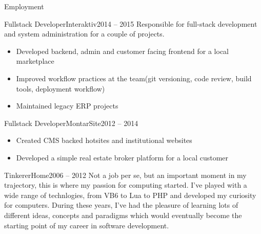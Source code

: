 \documentclass[]{Arroyo}
\begin{document}
\begin{cvsection}{Employment}
		\begin{cvsubsection}{Fullstack Developer}{Interaktiv}{2014 -- 2015}		
            Responsible for full-stack development and system administration for a couple of projects.
			\begin{itemize}
                \item Developed backend, admin and customer facing frontend for a local marketplace
                \item Improved workflow practices at the team(git versioning, code review, build tools, deployment workflow)
                \item Maintained legacy ERP projects
			\end{itemize}
		\end{cvsubsection}
		
		\begin{cvsubsection}{Fullstack Developer}{MontarSite}{2012 -- 2014}
			\begin{itemize}
                \item Created CMS backed hotsites and institutional websites
                \item Developed a simple real estate broker platform for a local customer
			\end{itemize} \end{cvsubsection}

		\begin{cvsubsection}{Tinkerer}{Home}{2006 -- 2012}
            Not a job per se, but an important moment in my trajectory, this is where my passion for computing started. I've played with a wide range of technlogies, from VB6 to Lua to PHP and developed my curiosity for computers.
            During these years, I’ve had the pleasure of learning lots of different ideas, concepts and paradigms which would eventually become the starting point of my career in software development.
		\end{cvsubsection}
	\end{cvsection}
	
\end{document}
